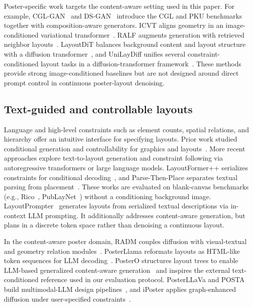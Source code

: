 \documentclass[review]{elsarticle}
\begin{document}
Poster-specific work targets the content-aware setting used in this paper. For example, CGL-GAN~\cite{Zhou22} and DS-GAN~\cite{Hsu23a} introduce the CGL and PKU benchmarks together with composition-aware generators. ICVT aligns geometry in an image-conditioned variational transformer~\cite{Cao22}. RALF augments generation with retrieved neighbor layouts~\cite{Horita24}. LayoutDiT balances background content and layout structure with a diffusion transformer~\cite{Li24}, and UniLayDiff unifies several constraint-conditioned layout tasks in a diffusion-transformer framework~\cite{Liu25UniLayDiff}. These methods provide strong image-conditioned baselines but are not designed around direct prompt control in continuous poster-layout denoising. %

\subsection{Text-guided and controllable layouts}
Language and high-level constraints such as element counts, spatial relations, and hierarchy offer an intuitive interface for specifying layouts. Prior work studied conditional generation and controllability for graphics and layouts~\cite{Li19,Jyothi19,Gupta21}. More recent approaches explore text-to-layout generation and constraint following via autoregressive transformers or large language models. LayoutFormer++ serializes constraints for conditional decoding~\cite{Jiang23}, and Parse-Then-Place separates textual parsing from placement~\cite{lin23a}. These works are evaluated on blank-canvas benchmarks (e.g., Rico~\cite{Deka17}, PubLayNet~\cite{Zhong19}) without a conditioning background image. LayoutPrompter~\cite{lin23b} generates layouts from serialized textual descriptions via in-context LLM prompting. It additionally addresses content-aware generation, but plans in a discrete token space rather than denoising a continuous layout.

In the content-aware poster domain, RADM couples diffusion with visual-textual and geometry relation
modules~\cite{Li23RADM}. PosterLlama reformats layouts as HTML-like token sequences for LLM decoding~\cite{Seol24PosterLlama}. PosterO structures layout trees to enable LLM-based generalized content-aware generation~\cite{Hsu25} and inspires the external text-conditioned reference used in our evaluation protocol. PosterLLaVa and POSTA build multimodal-LLM design pipelines~\cite{Yang24,Chen25}, and iPoster applies graph-enhanced diffusion under user-specified constraints~\cite{Zhou26iPoster}.
\end{document}
